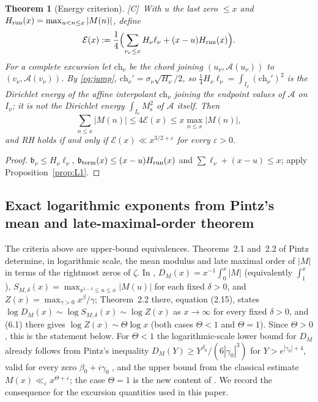 \documentclass[11pt,reqno]{amsart}
\numberwithin{equation}{section}
\theoremstyle{plain}
\newtheorem{theorem}{Theorem}[section]
\theoremstyle{definition}
\theoremstyle{remark}
\newcommand{\Ms}{M_{\mathrm{s}}}
\newcommand{\Anet}{\mathcal{A}}
\newcommand{\eps}{\varepsilon}
\newcommand{\En}{\mathcal{E}}
\newcommand{\tagC}{\textup{[C]}}
\begin{document}
\begin{theorem}[Energy criterion]
\label{thm:energy}
\tagC\ With $u$ the last zero $\le x$ and $H_{\rm run}(x)=\max_{u<n\le x}|M(n)|$,
define
\begin{equation}
\label{eq:energy_def}
  \En(x):=\frac14\Bigl(\sum_{v_\nu\le x}H_\nu\ell_\nu+(x-u)H_{\rm run}(x)\Bigr).
\end{equation}
For a complete excursion let $\mathrm{ch}_\nu$ be the chord joining
$(u_\nu,\Anet(u_\nu))$ to $(v_\nu,\Anet(v_\nu))$. By \eqref{eq:jump},
$\mathrm{ch}_\nu'=\sigma_\nu\sqrt{H_\nu}/2$, so $\tfrac14H_\nu\ell_\nu=\int_{I_\nu}(\mathrm{ch}_\nu')^2$
is the Dirichlet energy of the affine interpolant $\mathrm{ch}_\nu$ joining
the endpoint values of $\Anet$ on $I_\nu$; it is not the Dirichlet energy
$\int_{I_\nu}\Ms^2$ of $\Anet$ itself. Then
\begin{equation}
\label{eq:energy_sandwich}
  \sum_{n\le x}|M(n)|\le4\En(x)\le x\max_{n\le x}|M(n)|,
\end{equation}
and RH holds if and only if $\En(x)\ll x^{3/2+\eps}$ for every $\eps>0$.
\end{theorem}

\begin{proof}
$\mathfrak b_\nu\le H_\nu\ell_\nu$, $\mathfrak b_{\rm term}(x)\le(x-u)H_{\rm run}(x)$ and
$\sum\ell_\nu+(x-u)\le x$; apply Proposition~\ref{prop:L1}.
\end{proof}


\subsection{Exact logarithmic exponents from Pintz's mean and late-maximal-order theorem}
\label{subsec:pintz-exponents}

The criteria above are upper-bound equivalences.  Theorems~2.1 and~2.2 of
Pintz~\cite[Theorems~2.1--2.2, equations~(2.14)--(2.15)]{Pintz2026}
determine, in logarithmic scale, the mean modulus and late maximal order of
$|M|$ in terms of the rightmost zeros of $\zeta$. In \cite{Pintz2026}, $D_M(x)=x^{-1}\int_0^x|M|$ (equivalently $\int_1^x$),
$S_{M,\delta}(x)=\max_{x^{1-\delta}\le u\le x}|M(u)|$ for each fixed
$\delta>0$, and $Z(x)=\max_{\gamma>0}x^{\beta}/\gamma$; Theorem~2.2 there,
equation (2.15), states $\log D_M(x)\sim\log S_{M,\delta}(x)\sim\log Z(x)$ as
$x\to\infty$ for every fixed $\delta>0$, and (6.1) there gives
$\log Z(x)\sim\Theta\log x$ (both cases $\Theta<1$ and $\Theta=1$). Since
$\Theta>0$, this is the statement below.
For $\Theta<1$ the logarithmic-scale lower bound for $D_M$ already follows
from Pintz's inequality $D_M(Y)\ge Y^{\beta_0}/(6|\gamma_0|^3)$ for
$Y>e^{|\gamma_0|+4}$, valid for every zero $\beta_0+i\gamma_0$
\cite{Pintz1983}, and the upper bound from the classical estimate
$M(x)\ll_\eps x^{\Theta+\eps}$; the case $\Theta=1$ is the new content of
\cite{Pintz2026}.
We record the consequence for the excursion quantities used in this paper.
\end{document}
